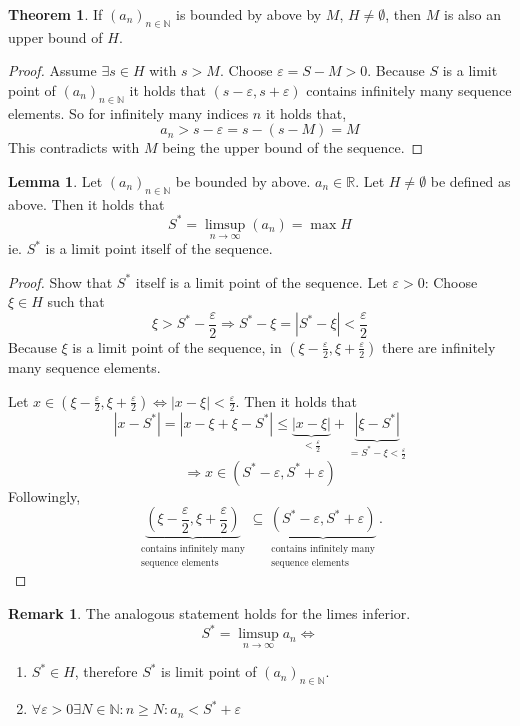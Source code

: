 \documentclass[a4paper,landscape,twocolumn]{article}
\theoremstyle{definition}
\newtheorem{theorem}{Theorem}
\newtheorem{rem}{Remark}
\newtheorem{lemma}{Lemma}
\newcommand\abs[1]{\left|#1\right|}
\newcommand\seq[1]{{\left(#1\right)}_{n \in \mathbb N}}
\begin{document}
\begin{theorem}
  If $\seq{a_n}$ is bounded by above by $M$, $H \neq \emptyset$, then $M$ is also an upper bound of $H$.
\end{theorem}
\begin{proof}
  Assume $\exists s \in H$ with $s > M$. Choose $\varepsilon = S - M > 0$.
  Because $S$ is a limit point of $\seq{a_n}$ it holds that $(s - \varepsilon, s + \varepsilon)$
  contains infinitely many sequence elements. So for infinitely many indices $n$ it holds that,
  \[ a_n > s - \varepsilon = s - (s - M) = M \]
  This contradicts with $M$ being the upper bound of the sequence.
\end{proof}

\begin{lemma}
  Let $\seq{a_n}$ be bounded by above. $a_n \in \mathbb R$. Let $H \neq \emptyset$ be defined as above.
  Then it holds that
  \[ S^* = \limsup_{n\to\infty}(a_n) = \max H \]
  ie. $S^*$ is a limit point itself of the sequence.
\end{lemma}
\begin{proof}
  Show that $S^*$ itself is a limit point of the sequence.
  Let $\varepsilon > 0$: Choose $\xi \in H$ such that
  \[ \xi > S^* - \frac\varepsilon2 \Rightarrow S^* - \xi = \abs{S^* - \xi} < \frac\varepsilon2 \]
  Because $\xi$ is a limit point of the sequence, in $(\xi - \frac\varepsilon2, \xi + \frac\varepsilon2)$
  there are infinitely many sequence elements.

  Let $x \in (\xi - \frac\varepsilon2, \xi + \frac\varepsilon2) \Leftrightarrow \abs{x - \xi} < \frac\varepsilon2$.
  Then it holds that
  \[
      \abs{x - S^*}
      = \abs{x - \xi + \xi - S^*}
      \leq \underbrace{\abs{x - \xi}}_{< \frac\varepsilon2} + \underbrace{\abs{\xi - S^*}}_{= S^* - \xi < \frac\varepsilon2}
  \] \[
      \Rightarrow x \in (S^* - \varepsilon, S^* + \varepsilon)
  \]
  Followingly,
  \[
    \underbrace{\left(\xi - \frac\varepsilon2, \xi + \frac\varepsilon2\right)}%
      _{\substack{\text{contains infinitely many} \\ \text{sequence elements}}}
    \subseteq \underbrace{\left(S^* - \varepsilon, S^* + \varepsilon\right)}%
      _{\substack{\text{contains infinitely many} \\ \text{sequence elements}}}.
  \]
\end{proof}

\begin{rem}
  The analogous statement holds for the limes inferior.
  \[ S^* = \limsup_{n\to\infty} a_n \Leftrightarrow \]
  \begin{enumerate}
    \item $S^* \in H$, therefore $S^*$ is limit point of $\seq{a_n}$.
    \item $\forall \varepsilon > 0 \exists N \in \mathbb N: n \geq N: a_n < S^* + \varepsilon$
  \end{enumerate}
\end{rem}
\end{document}
